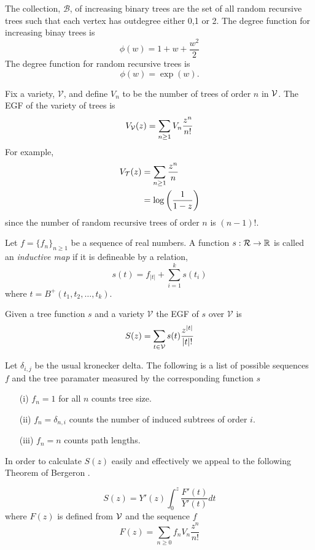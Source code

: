 \begin{ex}
 The collection, $\mathcal{B}$, of increasing binary trees are the set of all random recursive trees such that each vertex has 
 outdegree either 0,1 or 2.  The degree function for increasing binay trees is
 \[
  \phi(w) = 1 + w + \frac{w^2}{2}
 \]
The degree function for random recursive trees is
\[
 \phi(w) = \exp(w).
\]
\end{ex}
Fix a variety, $\mathcal{V}$, and define $V_n$ to be the number of trees of order $n$ in $\operatorname{\mathcal{V}}$.  The EGF of the variety of trees 
is 
\[
 V_{\operatorname{\mathcal{V}}}(z) = \sum_{n \geq 1} V_n \frac{z^n}{n!}
\]
For example, 
\begin{align}
V_{\operatorname{\mathcal{T}}}(z) &= \sum_{n\geq 1} \frac{z^n}{n} \\
&= \log\left( \frac{1}{1-z}\right)
\end{align}
since the number of random recursive trees of order $n$ is $(n-1)!$.

\begin{defn}
Let $f = \{f_n\}_{n\geq 1}$ be a sequence of real numbers.  A function $s: \operatorname{\mathcal{R}} \rightarrow \mathbb{R}$ is called an 
\emph{inductive map} if it is defineable by a relation,
\[
 s(t) = f_{\lvert t \rvert} + \sum_{i=1}^k s(t_i)
\]
where $t = B^{+}(t_1,t_2,\dots,t_k)$.
\end{defn}
Given a tree function $s$ and a variety $\mathcal{V}$ the EGF of $s$ over $\mathcal{V}$ is 
\[
 S(z) = \sum_{t \in \operatorname{\mathcal{V}}} s(t) \frac{z^{\lvert t \rvert}}{\lvert t \rvert !}
\]
\begin{ex}
 Let $\delta_{i,j}$ be the usual kronecker delta. The following is a list of possible sequences $f$ and the tree paramater 
 measured by the corresponding function $s$
 \begin{itemize}
  \item[(i)]   $f_n = 1$ for all $n$ counts tree size.
  \item[(ii)] $f_n = \delta_{n,i}$ counts the number of induced subtrees of order $i$.
  \item[(iii)] $f_n = n$ counts path lengths.
 \end{itemize}
 \end{ex}

In order to calculate $S(z)$ easily and effectively we appeal to the following Theorem of Bergeron \cite{Bergeron}.
\begin{thm}
 \[
 S(z) = Y'(z) \int_{0}^{z} \frac{F'(t)}{Y'(t)} dt
 \]
where $F(z)$ is defined from $\operatorname{\mathcal{V}}$ and the sequence $f$
\[
 F(z) = \sum_{n \geq 0} f_n V_n \frac{z^n}{n!}
\]
\end{thm}

